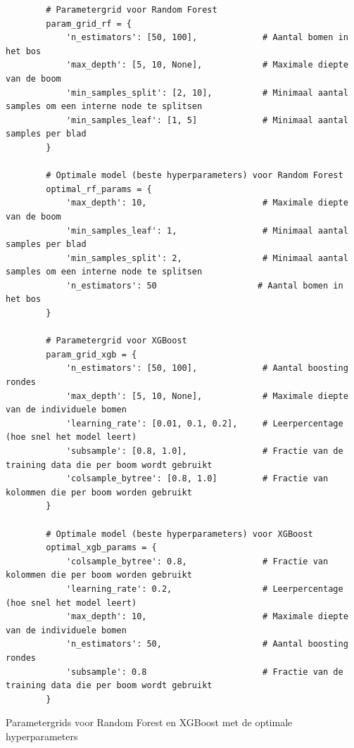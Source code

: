 \begin{listing}[H]
    \small  %
    \begin{verbatim}
        # Parametergrid voor Random Forest
        param_grid_rf = {
            'n_estimators': [50, 100],             # Aantal bomen in het bos
            'max_depth': [5, 10, None],            # Maximale diepte van de boom
            'min_samples_split': [2, 10],          # Minimaal aantal samples om een interne node te splitsen
            'min_samples_leaf': [1, 5]             # Minimaal aantal samples per blad
        }
        
        # Optimale model (beste hyperparameters) voor Random Forest
        optimal_rf_params = {
            'max_depth': 10,                       # Maximale diepte van de boom
            'min_samples_leaf': 1,                 # Minimaal aantal samples per blad
            'min_samples_split': 2,                # Minimaal aantal samples om een interne node te splitsen
            'n_estimators': 50                    # Aantal bomen in het bos
        }
        
        # Parametergrid voor XGBoost
        param_grid_xgb = {
            'n_estimators': [50, 100],             # Aantal boosting rondes
            'max_depth': [5, 10, None],            # Maximale diepte van de individuele bomen
            'learning_rate': [0.01, 0.1, 0.2],     # Leerpercentage (hoe snel het model leert)
            'subsample': [0.8, 1.0],               # Fractie van de training data die per boom wordt gebruikt
            'colsample_bytree': [0.8, 1.0]         # Fractie van kolommen die per boom worden gebruikt
        }
        
        # Optimale model (beste hyperparameters) voor XGBoost
        optimal_xgb_params = {
            'colsample_bytree': 0.8,               # Fractie van kolommen die per boom worden gebruikt
            'learning_rate': 0.2,                  # Leerpercentage (hoe snel het model leert)
            'max_depth': 10,                       # Maximale diepte van de individuele bomen
            'n_estimators': 50,                    # Aantal boosting rondes
            'subsample': 0.8                       # Fractie van de training data die per boom wordt gebruikt
        }
    \end{verbatim}
    \caption{Parametergrids voor Random Forest en XGBoost met de optimale hyperparameters}
    \label{lst:parametergrids_optimal}
\end{listing}


